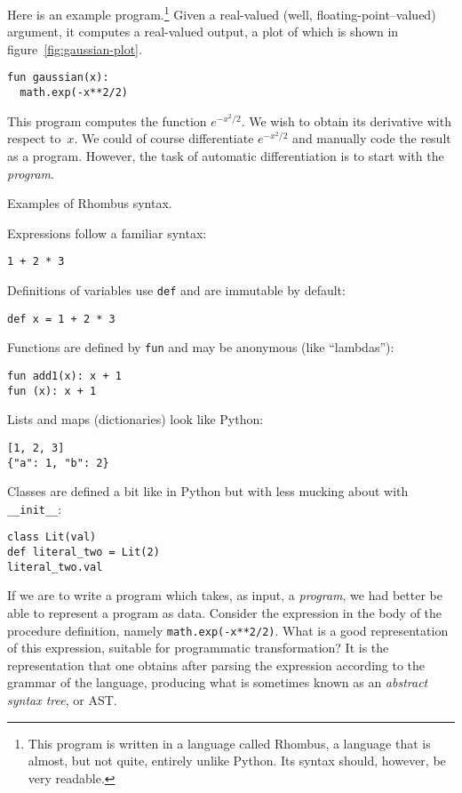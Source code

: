 \documentclass[11pt, a4paper]{article}
\newcommand{\cd}[1]{\texttt{#1}}
\begin{document}
Here is an example program.\footnote{This program is written in a
  language called Rhombus, a language that is almost, but not quite,
  entirely unlike Python. Its syntax should, however, be very
  readable.} Given a real-valued (well, floating-point--valued)
argument, it computes a real-valued output, a plot of which is shown
in figure~\ref{fig:gaussian-plot}.
\begin{verbatim}
fun gaussian(x):
  math.exp(-x**2/2)
\end{verbatim}
This program computes the function $e^{-x^2/2}$. We wish to obtain its
derivative with respect to~$x$. We could of course
differentiate $e^{-x^2/2}$ and manually code the result as a
program. However, the task of automatic differentiation is to start
with the \emph{program}.
\begin{marginfigure}
  \caption{Examples of Rhombus syntax.}
  \footnotesize
  Expressions follow a familiar syntax:
\begin{verbatim}
1 + 2 * 3
\end{verbatim}
  Definitions of variables use \cd{def} and are immutable by default:
\begin{verbatim}
def x = 1 + 2 * 3
\end{verbatim}
  Functions are defined by \cd{fun} and may be anonymous (like
  ``lambdas''):
\begin{verbatim}
fun add1(x): x + 1
fun (x): x + 1
\end{verbatim}
  Lists and maps (dictionaries) look like Python:
\begin{verbatim}
[1, 2, 3]
{"a": 1, "b": 2} 
\end{verbatim}
  Classes are defined a bit like in Python but with less mucking about
  with \cd{__init__}:
\begin{verbatim}
class Lit(val)
def literal_two = Lit(2)
literal_two.val 
\end{verbatim}
\end{marginfigure}

If we are to write a program which takes, as input, a \emph{program},
we had better be able to represent a program as data. Consider the
expression in the body of the procedure definition, namely
\cd{math.exp(-x**2/2)}. What is a good representation of this
expression, suitable for programmatic transformation? It is the
representation that one obtains after parsing the expression according
to the grammar of the language, producing what is sometimes known as
an \emph{abstract syntax tree}, or AST.
\end{document}
